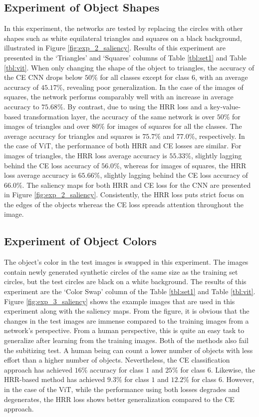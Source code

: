 \documentclass[letterpaper]{article} %
\begin{document}
\subsection{Experiment of Object Shapes}
In this experiment, the networks are tested by replacing the circles with other shapes such as white equilateral triangles and squares on a black background, illustrated in Figure \ref{fig:exp_2_saliency}. Results of this experiment are presented in the `Triangles’ and `Squares’ columns of Table \ref{tbl:set1} and Table \ref{tbl:vit}. When only changing the shape of the object to triangles, the accuracy of the CE CNN drops below $50\%$ for all classes except for class $6$, with an average accuracy of $45.17\%$, revealing poor generalization. In the case of the images of squares, the network performs comparably well with an increase in average accuracy to $75.68\%$. By contrast, due to using the HRR loss and a key-value-based transformation layer, the accuracy of the same network is over $50\%$ for images of triangles and over $80\%$ for images of squares for all the classes. The average accuracy for triangles and squares is $75.7\%$ and $77.0\%$, respectively. In the case of ViT, the performance of both HRR and CE losses are similar. For images of triangles, the HRR loss average accuracy is $55.33\%$, slightly lagging behind the CE loss accuracy of $56.0\%$, whereas for images of squares, the HRR loss average accuracy is $65.66\%$, slightly lagging behind the CE loss accuracy of $66.0\%$. The saliency maps for both HRR and CE loss for the CNN are presented in Figure \ref{fig:exp_2_saliency}. Consistently, the HRR loss puts strict focus on the edges of the objects whereas the CE loss spreads attention throughout the image.

\subsection{Experiment of Object Colors}
The object's color in the test images is swapped in this experiment. The images contain newly generated synthetic circles of the same size as the training set circles, but the test circles are black on a white background. The results of this experiment are the `Color Swap’ column of the Table \ref{tbl:set1} and Table \ref{tbl:vit}. Figure \ref{fig:exp_3_saliency} shows the example images that are used in this experiment along with the saliency maps. From the figure, it is obvious that the changes in the test images are immense compared to the training images from a network’s perspective. From a human perspective, this is quite an easy task to generalize after learning from the training images. Both of the methods also fail the subitizing test. A human being can count a lower number of objects with less effort than a higher number of objects. Nevertheless, the CE classification approach has achieved $16\%$ accuracy for class $1$ and $25\%$ for class $6$. Likewise, the HRR-based method has achieved $9.3\%$ for class $1$ and $12.2\%$ for class $6$. However, in the case of the ViT, while the performance using both losses degrades and degenerates, the HRR loss shows better generalization compared to the CE approach.
\end{document}
